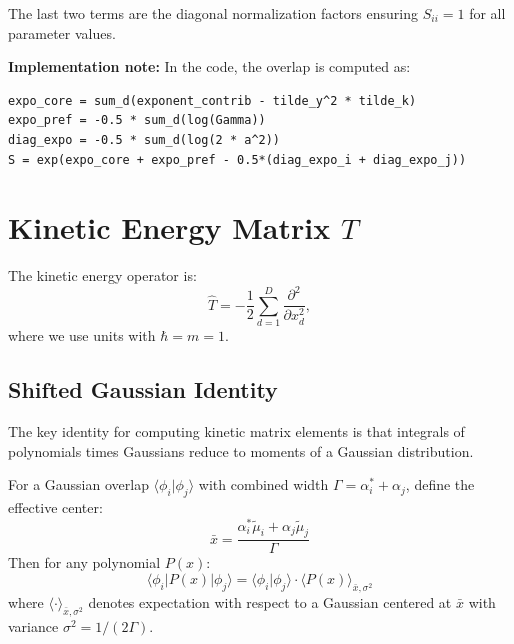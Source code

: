 \documentclass[11pt,a4paper]{article}
\theoremstyle{definition}
\begin{document}
The last two terms are the diagonal normalization factors ensuring $S_{ii} = 1$ for all parameter values.

\textbf{Implementation note:} In the code, the overlap is computed as:
\begin{verbatim}
expo_core = sum_d(exponent_contrib - tilde_y^2 * tilde_k)
expo_pref = -0.5 * sum_d(log(Gamma))
diag_expo = -0.5 * sum_d(log(2 * a^2))
S = exp(expo_core + expo_pref - 0.5*(diag_expo_i + diag_expo_j))
\end{verbatim}

\section{Kinetic Energy Matrix $T$}

The kinetic energy operator is:
\begin{equation}
\hat{T} = -\frac{1}{2} \sum_{d=1}^{D} \frac{\partial^2}{\partial x_d^2},
\end{equation}
where we use units with $\hbar = m = 1$.

\subsection{Shifted Gaussian Identity}

The key identity for computing kinetic matrix elements is that integrals of polynomials times Gaussians reduce to moments of a Gaussian distribution.

\begin{tcolorbox}[colback=yellow!5,colframe=yellow!50!black,title=Shifted Gaussian Identity]
For a Gaussian overlap $\langle \phi_i | \phi_j \rangle$ with combined width $\Gamma = \alpha_i^* + \alpha_j$, define the effective center:
\begin{equation}
\bar{x} = \frac{\alpha_i^* \tilde{\mu}_i + \alpha_j \tilde{\mu}_j}{\Gamma}
\end{equation}
Then for any polynomial $P(x)$:
\begin{equation}
\langle \phi_i | P(x) | \phi_j \rangle = \langle \phi_i | \phi_j \rangle \cdot \langle P(x) \rangle_{\bar{x}, \sigma^2}
\end{equation}
where $\langle \cdot \rangle_{\bar{x}, \sigma^2}$ denotes expectation with respect to a Gaussian centered at $\bar{x}$ with variance $\sigma^2 = 1/(2\Gamma)$.
\end{tcolorbox}
\end{document}
